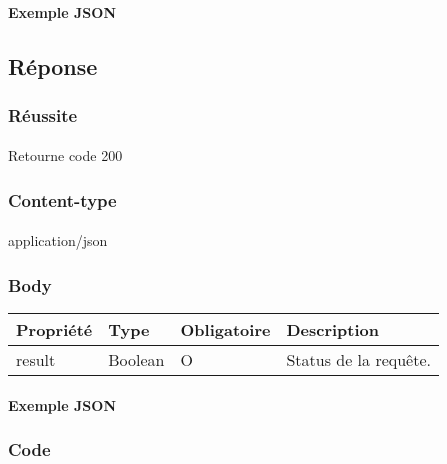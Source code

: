 	\newpage
		\paragraph{Exemple JSON}
			\paragraph{}
			

\subsection{Réponse}
	\subsubsection{Réussite}
		\paragraph{}
			Retourne code 200
			
	\subsubsection{Content-type}
		\paragraph{}
			application/json
	
	\subsubsection{Body}
		\begin{center}
			\begin{tabularx}{\textwidth}{| T{0.2122\textwidth} | S{0.22\textwidth} | S{0.15\textwidth} | S{0.3\textwidth} |}
				\hline
				Propriété & Type & Obligatoire & Description \\
				\hline
				result & Boolean & O & Status de la requête. \\
				\hline
			\end{tabularx}
		\end{center}
		
		\paragraph{Exemple JSON}
			\paragraph{}
			
			
			
	\subsubsection{Code}
		\paragraph{}
